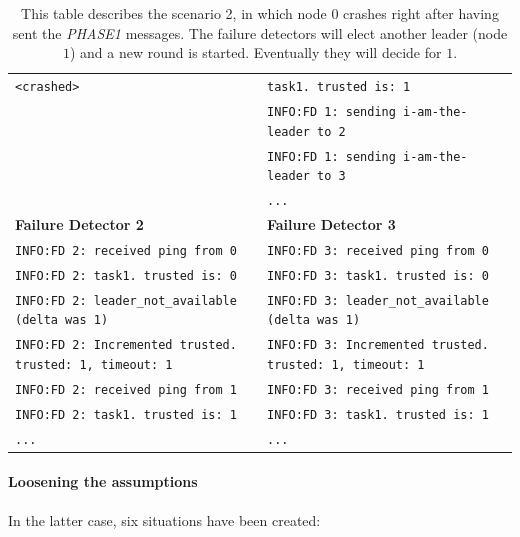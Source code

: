 \documentclass[a4paper]{article}
\begin{document}
\begin{compactitem}
\begin{table}[H]
\begin{tabular}{ll}
		\verb|<crashed>| & \verb|task1. trusted is: 1| \\
		& \verb|INFO:FD 1: sending i-am-the-leader to 2| \\
		& \verb|INFO:FD 1: sending i-am-the-leader to 3| \\
		& \verb|...| \\
        \midrule
		\textbf{Failure Detector 2} & \textbf{Failure Detector 3} \\
		\midrule
        \verb|INFO:FD 2: received ping from 0| & \verb|INFO:FD 3: received ping from 0| \\
		\verb|INFO:FD 2: task1. trusted is: 0| & \verb|INFO:FD 3: task1. trusted is: 0| \\
		\verb|INFO:FD 2: leader_not_available (delta was 1)| & \verb|INFO:FD 3: leader_not_available (delta was 1)| \\
		\verb|INFO:FD 2: Incremented trusted. trusted: 1, timeout: 1| & \verb|INFO:FD 3: Incremented trusted. trusted: 1, timeout: 1| \\
		\verb|INFO:FD 2: received ping from 1| & \verb|INFO:FD 3: received ping from 1| \\
		\verb|INFO:FD 2: task1. trusted is: 1| & \verb|INFO:FD 3: task1. trusted is: 1| \\
		\verb|...| & \verb|...| \\
        \bottomrule
        \end{tabular}
        \caption{\small{This table describes the scenario 2, in which node $0$ crashes right after having sent the \emph{PHASE1} messages. The failure detectors will elect another leader (node $1$) and a new round is started. Eventually they will decide for $1$.}}
        \label{table:scenario2}
	\end{table}
\end{compactitem}

\paragraph{Loosening the assumptions}
In the latter case, six situations have been created:
\end{document}
